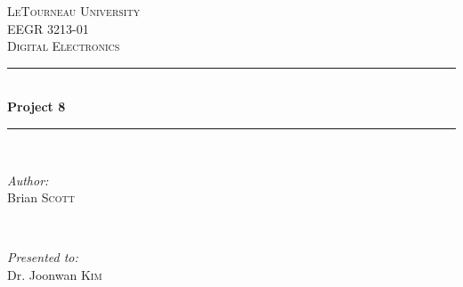 \begin{titlepage}
\newcommand{\HRule}{\rule{\linewidth}{0.4mm}} %

\center %


\textsc{\LARGE LeTourneau University}\\[1.5cm] %
\textsc{\Large EEGR 3213-01}\\[0.5cm] %
\textsc{\large Digital Electronics}\\[0.5cm] %


\HRule \\[0.4cm]
{\huge \bfseries Project 8}\\[2mm] %
\HRule \\[3cm]

\begin{minipage}{0.35\textwidth}
	\begin{flushleft} \Large
		\emph{Author:}\\
		Brian \textsc{Scott} %
	\end{flushleft}
\end{minipage}
~
\begin{minipage}{0.35\textwidth}
	\begin{flushright} \Large
		\emph{Presented to:} \\
		Dr. Joonwan \textsc{Kim} %
	\end{flushright}
\end{minipage}\\[4cm]



\end{titlepage}

